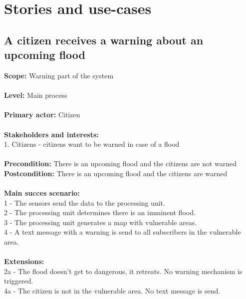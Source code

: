 \section{Stories and use-cases}
\subsection{A citizen receives a warning about an upcoming flood}
\textbf{Scope:} Warning part of the system\\\\
\textbf{Level:} Main process\\\\
\textbf{Primary actor:} Citizen\\\\
\textbf{Stakeholders and interests:}\\

	1. Citizens - citizens want to be warned in case of a flood \\\\
\textbf{Precondition:} There is an upcoming flood and the citizens are not warned\\
\textbf{Postcondition:} There is an upcoming flood and the citizens are warned\\\\
\textbf{Main succes scenario:} \\
1 - The sensors send the data to the processing unit.\\
2 - The processing unit determines there is an imminent flood.\\
3 - The processing unit generates a map with vulnerable areas.\\
4 - A text message with a warning is send to all subscribers in the vulnerable area.\\\\
\textbf{Extensions:} \\
2a - The flood doesn't get to dangerous, it retreats. No warning mechanism is triggered.\\
4a - The citizen is not in the vulnerable area. No text message is send.

